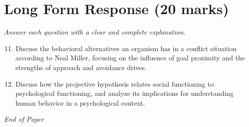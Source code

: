 \documentclass[12pt]{article}
\begin{document}
\section*{Long Form Response (20 marks)}
\textit{Answer each question with a clear and complete explanation.}
\begin{enumerate}[label=\arabic*.]
\setcounter{enumi}{10}
\item Discuss the behavioral alternatives an organism has in a conflict situation according to Neal Miller, focusing on the influence of goal proximity and the strengths of approach and avoidance drives.
\item Discuss how the projective hypothesis relates social functioning to psychological functioning, and analyze its implications for understanding human behavior in a psychological context.
\end{enumerate}

\vfill
\noindent\textit{End of Paper}
\end{document}
